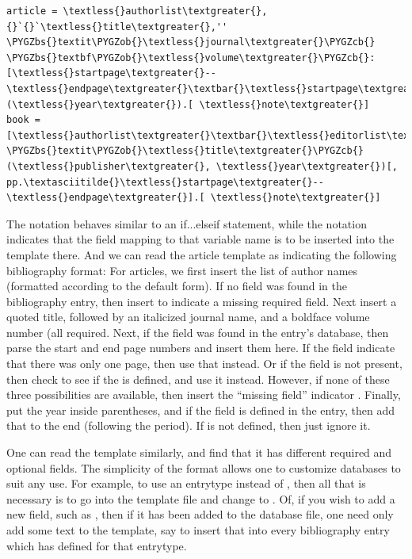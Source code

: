 \documentclass[letterpaper,10pt,english]{sphinxmanual}
\def\PYGZbs{\char`\\}
\def\PYGZob{\char`\{}
\def\PYGZcb{\char`\}}
\begin{document}
\begin{Verbatim}[commandchars=\\\{\}]
article = \textless{}authorlist\textgreater{}, {}`{}`\textless{}title\textgreater{},'' \PYGZbs{}textit\PYGZob{}\textless{}journal\textgreater{}\PYGZcb{} \PYGZbs{}textbf\PYGZob{}\textless{}volume\textgreater{}\PYGZcb{}: [\textless{}startpage\textgreater{}--\textless{}endpage\textgreater{}\textbar{}\textless{}startpage\textgreater{}\textbar{}\textless{}eid\textgreater{}\textbar{}] (\textless{}year\textgreater{}).[ \textless{}note\textgreater{}]
book = [\textless{}authorlist\textgreater{}\textbar{}\textless{}editorlist\textgreater{}\textbar{}], \PYGZbs{}textit\PYGZob{}\textless{}title\textgreater{}\PYGZcb{} (\textless{}publisher\textgreater{}, \textless{}year\textgreater{})[, pp.\textasciitilde{}\textless{}startpage\textgreater{}--\textless{}endpage\textgreater{}].[ \textless{}note\textgreater{}]
\end{Verbatim}

The \code{{[}...\textbar{}...{]}} notation behaves similar to an if...elseif statement, while the 
notation indicates that the field mapping to that variable name is to be inserted into the
template there. And we can read the article template as indicating the following bibliography
format: For articles, we first insert the list of author names (formatted according to the default
form). If no  field was found in the bibliography entry, then insert  to indicate
a missing required field. Next insert a quoted title, followed by an italicized journal name, and
a boldface volume number (all required. Next, if the  field was found in the entry's
database, then parse the start and end page numbers and insert them here. If the  field
indicate that there was only one page, then use that instead. Or if the  field is not
present, then check to see if the  is defined, and use it instead. However, if none of
these three possibilities are available, then insert the ``missing field'' indicator .
Finally, put the year inside parentheses, and if the  field is defined in the entry, then
add that to the end (following the period). If  is not defined, then just ignore it.

One can read the  template similarly, and find that it has different required and optional
fields. The simplicity of the format allows one to customize databases to suit any use. For
example, to use an entrytype  instead of , then all that is necessary is to go
into the template file and change  to . Of, if you wish to add a new field, such
as , then if it has been added to the  database file, one need only add some
text to the template, say  to insert that into every bibliography entry
which has  defined for that entrytype.
\end{document}
